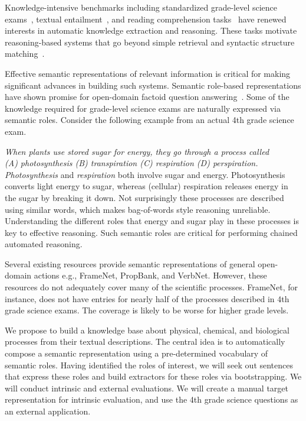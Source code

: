 Knowledge-intensive benchmarks including standardized grade-level science exams~\cite{clark2015elementary}, 
textual entailment~\cite{dagan2010recognizing}, and reading comprehension tasks~\cite{richardson2013mctest} have renewed interests in automatic knowledge extraction and reasoning. 
These tasks motivate reasoning-based systems that go beyond simple retrieval and syntactic structure matching~\cite{clark2014:akbc,chb2013:akbc, khot2015:emlnlp}. 

Effective semantic representations of relevant information is critical for making significant advances in building such systems. 
Semantic role-based representations have shown promise for open-domain factoid question answering~\cite{shen2007using, pizzato2008indexing}. 
Some of the knowledge required for grade-level science exams are naturally expressed via semantic roles.
Consider the following example from an actual 4th grade science exam.

{\em When plants use stored sugar for energy, they go through a process called \\
(A) photosynthesis (B) transpiration (C) respiration (D) perspiration.}\\

{\em Photosynthesis} and {\em respiration} both involve sugar and energy. 
Photosynthesis converts light energy to sugar, whereas (cellular) respiration releases energy in the sugar by breaking it down. 
Not surprisingly these processes are described using similar words, which makes bag-of-words style reasoning unreliable. 
Understanding the different roles that energy and sugar play in these processes is key to effective reasoning.
Such semantic roles are critical for performing chained automated reasoning. 

Several existing resources provide semantic representations of general open-domain actions e.g., FrameNet, PropBank, and VerbNet. 
However, these resources do not adequately cover many of the scientific processes. 
FrameNet, for instance, does not have entries for nearly half of the processes described in 4th grade science exams. 
The coverage is likely to be worse for higher grade levels.

We propose to build a knowledge base about physical, chemical, and biological processes from their textual descriptions. 
The central idea is to automatically compose a semantic representation using a pre-determined vocabulary of semantic roles. 
Having identified the roles of interest, we will seek out sentences that express these roles and build extractors for these roles via bootstrapping.
We will conduct intrinsic and external evaluations. 
We will create a manual target representation for intrinsic evaluation, and use the 4th grade science questions as an external application.

